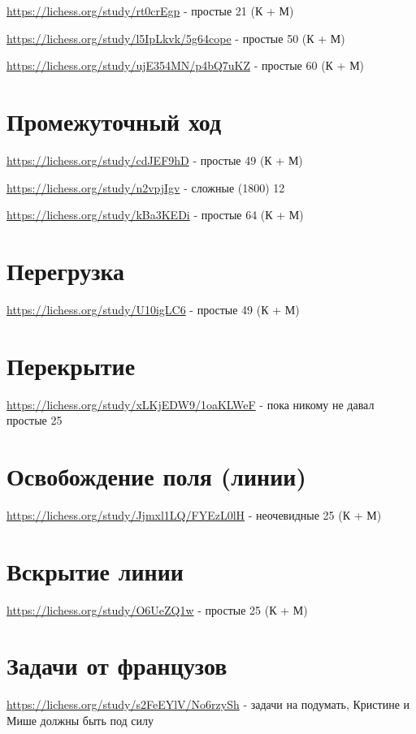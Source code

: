 \documentclass{article}
\begin{document}
\url{https://lichess.org/study/rt0crEgp} - простые 21 (К + М)

\url{https://lichess.org/study/l5IpLkvk/5g64cope} - простые 50 (К + М)

\url{https://lichess.org/study/ujE354MN/p4bQ7uKZ} - простые 60 (К + М)
\section{Промежуточный ход}
\url{https://lichess.org/study/cdJEF9hD} - простые 49 (К + М)

\url{https://lichess.org/study/n2vpjIgv} - сложные (1800) 12 

\url{https://lichess.org/study/kBa3KEDi} - простые 64 (К + М)
\section{Перегрузка}
\url{https://lichess.org/study/U10igLC6} - простые 49 (К + М)

\section{Перекрытие}
\url{https://lichess.org/study/xLKjEDW9/1oaKLWeF} - пока никому не давал
простые 25
\section{Освобождение поля (линии)}
\url{https://lichess.org/study/Jjmxl1LQ/FYEzL0lH} - неочевидные 25 (К + М)
\section{Вскрытие линии}
\url{https://lichess.org/study/O6UeZQ1w} - простые 25 (К + М)


\section{Задачи от французов}
\url{https://lichess.org/study/s2FeEYlV/No6rzySh} - задачи на подумать, Кристине и Мише должны быть под силу
\end{document}
